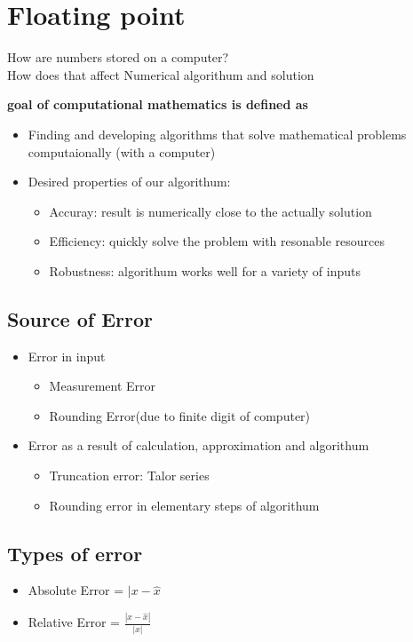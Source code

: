 \documentclass[10pt]{article}
\theoremstyle{break}
\begin{document}
\section{Floating point}
    How are numbers stored on a computer?\\
    How does that affect Numerical algorithum and solution\\
    {\textbf{goal of computational mathematics is defined as}\begin{itemize}
        \item Finding and developing algorithms that solve mathematical problems computaionally (with a computer)
        \item Desired properties of our algorithum: \begin{itemize}
            \item Accuray: result is numerically close to the actually solution
            \item Efficiency: quickly solve the problem with resonable resources
            \item Robustness: algorithum works well for a variety of inputs
        \end{itemize}
    \end{itemize}
    \subsection{Source of Error}
        \begin{itemize}
            \item Error in input\begin{itemize}
                \item Measurement Error 
                \item Rounding Error(due to finite digit of computer) 
            \end{itemize}
            \item Error as a result of calculation, approximation and algorithum \begin{itemize}
                \item Truncation error: Talor series
                \item Rounding error in elementary steps of algorithum
            \end{itemize}
        \end{itemize}
    \subsection{Types of error}
        \begin{itemize}
            \item Absolute Error = $|x-\hat{x}$
            \item Relative Error = $\frac{|x-\hat{x}|}{|x|}$
        \end{itemize}
}
\end{document}
